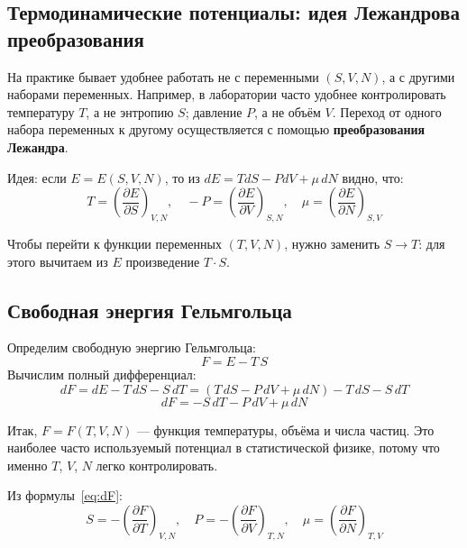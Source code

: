 \documentclass[../general/general]{subfiles}
\begin{document}
\subsection{Термодинамические потенциалы: идея Лежандрова преобразования}

На практике бывает удобнее работать не с переменными $(S, V, N)$, а с другими наборами переменных. Например, в лаборатории часто удобнее контролировать температуру $T$, а не энтропию $S$; давление $P$, а не объём $V$. Переход от одного набора переменных к другому осуществляется с помощью \textbf{преобразования Лежандра}.

Идея: если $E = E(S, V, N)$, то из $dE = TdS - PdV + \mu\,dN$ видно, что:
\begin{equation}
    T = \left(\frac{\partial E}{\partial S}\right)_{V,N}, \quad -P = \left(\frac{\partial E}{\partial V}\right)_{S,N}, \quad \mu = \left(\frac{\partial E}{\partial N}\right)_{S,V}
\end{equation}

Чтобы перейти к функции переменных $(T, V, N)$, нужно заменить $S \to T$: для этого вычитаем из $E$ произведение $T\cdot S$.

\subsection{Свободная энергия Гельмгольца}

Определим свободную энергию Гельмгольца:
\begin{equation}
    F = E - T\,S
\end{equation}
Вычислим полный дифференциал:
\begin{equation}
    dF = dE - T\,dS - S\,dT = (T\,dS - P\,dV + \mu\,dN) - T\,dS - S\,dT
\end{equation}
\begin{equation}
    \boxed{dF = -S\,dT - P\,dV + \mu\,dN}
    \label{eq:dF}
\end{equation}

Итак, $F = F(T, V, N)$ --- функция температуры, объёма и числа частиц. Это наиболее часто используемый потенциал в статистической физике, потому что именно $T$, $V$, $N$ легко контролировать.

Из формулы~\eqref{eq:dF}:
\begin{equation}
    S = -\left(\frac{\partial F}{\partial T}\right)_{V,N}, \quad P = -\left(\frac{\partial F}{\partial V}\right)_{T,N}, \quad \mu = \left(\frac{\partial F}{\partial N}\right)_{T,V}
\end{equation}
\end{document}
